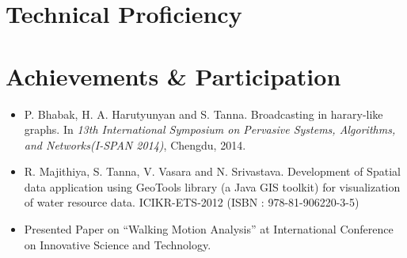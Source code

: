 \documentclass[12pt,a4paper,sans]{moderncv} %
\begin{document}


\section{Technical Proficiency}





\section{Achievements \& Participation}
\begin{itemize}
\item P. Bhabak, H. A. Harutyunyan and S. Tanna. Broadcasting in harary-like graphs. In \textit{13th International Symposium on Pervasive Systems, Algorithms, and Networks(I-SPAN 2014)}, Chengdu, 2014. \\
\item 	R. Majithiya, S. Tanna, V. Vasara and N. Srivastava. Development of Spatial data application using GeoTools library (a Java GIS toolkit) for visualization of water resource data. ICIKR-ETS-2012 (ISBN : 978-81-906220-3-5) \\
\item Presented Paper on ``Walking Motion Analysis'' at International Conference on Innovative Science and Technology.

\end{itemize}
\end{document}
